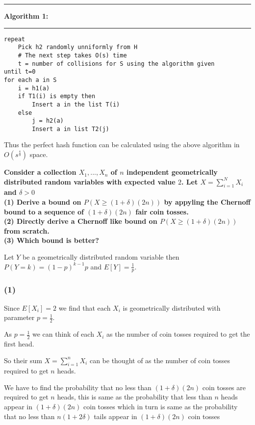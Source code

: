 \documentclass[a4paper]{article}
\begin{document}
\pagebreak
\noindent\rule{\textwidth}{0.4pt}
\textbf{Algorithm 1:} \\
\noindent\rule{\textwidth}{0.2pt}
\begin{lstlisting}[columns=fullflexible] 
repeat
    Pick h2 randomly unniformly from H
    # The next step takes O(s) time
    t = number of collisions for S using the algorithm given
until t=0
for each a in S
    i = h1(a)
    if T1(i) is empty then
        Insert a in the list T(i)
    else
        j = h2(a)
        Insert a in list T2(j)
\end{lstlisting}
\vspace{1.3em}

Thus the perfect hash function can be calculated using the above algorithm in $O(s^{\frac{4}{3}})$ space.
\pagebreak



\begin{question}[]
\textbf{Consider a collection $X_1, ..., X_n$ of $n$ independent geometrically distributed random variables with expected value $2$. Let $X = \sum_{i=1}^NX_i$ and $\delta > 0$\\
(1) Derive a bound on $P(X \geq (1 + \delta)(2n))$ by appyling the Chernoff bound to a sequence of $(1 + \delta)(2n)$ fair coin tosses.} \\
\textbf{(2) Directly derive a Chernoff like bound on $P(X \geq (1 + \delta)(2n))$ from scratch.} \\
\textbf{(3) Which bound is better?}

\end{question}
Let $Y$ be a geometrically distributed random variable then $P(Y=k) = (1-p)^{k-1}p$ and $E[Y]=\frac{1}{p}$.
\subsubsection*{(1)}
Since $E[X_i] = 2$ we find that each $X_i$ is geometrically distributed with parameter $p=\frac{1}{2}$.

As $p=\frac{1}{2}$ we can think of each $X_i$ as the number of coin tosses required to get the first head.

So their sum $X = \sum_{i=1}^nX_i$ can be thought of as the number of coin tosses required to get $n$ heads.

We have to find the probability that no less than $(1+\delta)(2n)$ coin tosses are required to get $n$ heads, this is same as the probability that less than $n$ heads appear in $(1+\delta)(2n)$ coin tosses which in turn is same as the probability that no less than $n(1+2\delta)$ tails appear in $(1+\delta)(2n)$ coin tosses
\end{document}
